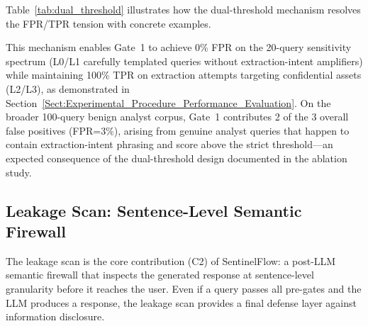 \documentclass[journal]{IEEEtran}
\begin{document}
Table~\ref{tab:dual_threshold} illustrates how the dual-threshold mechanism resolves the FPR/TPR tension with concrete examples.

\begin{table}[!ht]
    \centering
    \caption{Dual-Threshold Mechanism: Example Decisions}
    \label{tab:dual_threshold}
\end{table}

This mechanism enables Gate~1 to achieve 0\% FPR on the 20-query sensitivity spectrum (L0/L1 carefully templated queries without extraction-intent amplifiers) while maintaining 100\% TPR on extraction attempts targeting confidential assets (L2/L3), as demonstrated in Section~\ref{Sect:Experimental_Procedure_Performance_Evaluation}. On the broader 100-query benign analyst corpus, Gate~1 contributes 2 of the 3 overall false positives (FPR=3\%), arising from genuine analyst queries that happen to contain extraction-intent phrasing and score above the strict threshold---an expected consequence of the dual-threshold design documented in the ablation study.

\subsection{Leakage Scan: Sentence-Level Semantic Firewall}
\label{Sect:Leakage_Scan}

The leakage scan is the core contribution (C2) of SentinelFlow: a post-LLM semantic firewall that inspects the generated response at sentence-level granularity before it reaches the user. Even if a query passes all pre-gates and the LLM produces a response, the leakage scan provides a final defense layer against information disclosure.
\end{document}
